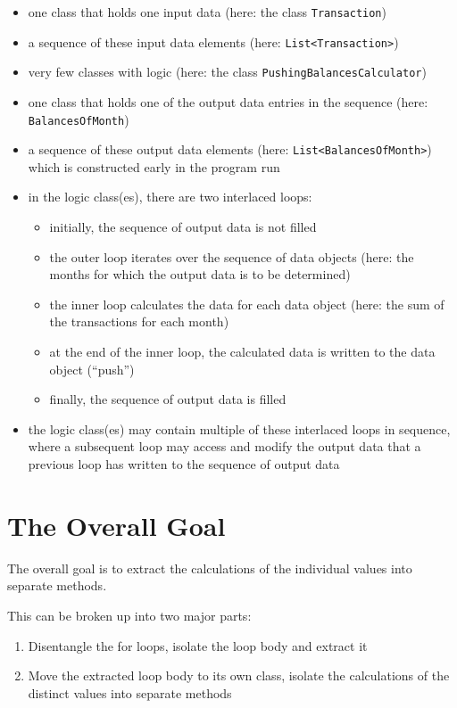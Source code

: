 \documentclass[a4paper,fleqn,titlepage,11pt]{article}
\begin{document}
\begin{itemize}
\item one class that holds one input data (here: the class \texttt{Transaction})
\item a sequence of these input data elements (here: \texttt{List<Transaction>})
\item very few classes with logic (here: the class \texttt{PushingBalancesCalculator})
\item one class that holds one of the output data entries in the sequence (here: \texttt{BalancesOfMonth})
\item a sequence of these output data elements (here: \texttt{List<BalancesOfMonth>}) which is constructed early in the program run
\item in the logic class(es), there are two interlaced loops: 
\begin{itemize}
\item initially, the sequence of output data is not filled
\item the outer loop iterates over the sequence of data objects (here: the months for which the output data is to be determined)
\item the inner loop calculates the data for each data object (here: the sum of the transactions for each month)
\item at the end of the inner loop, the calculated data is written to the data object (``push'')
\item finally, the sequence of output data is filled
\end{itemize}
\item the logic class(es) may contain multiple of these interlaced loops in sequence, where a subsequent loop may access and modify the output data that a previous loop has written to the sequence of output data
\end{itemize}

\section{The Overall Goal}

The overall goal is to extract the calculations of the individual values into separate methods.

This can be broken up into two major parts:

\begin{enumerate}
\item Disentangle the for loops, isolate the loop body and extract it
\item Move the extracted loop body to its own class, isolate the calculations of the distinct values into separate methods
\end{enumerate}
\end{document}
